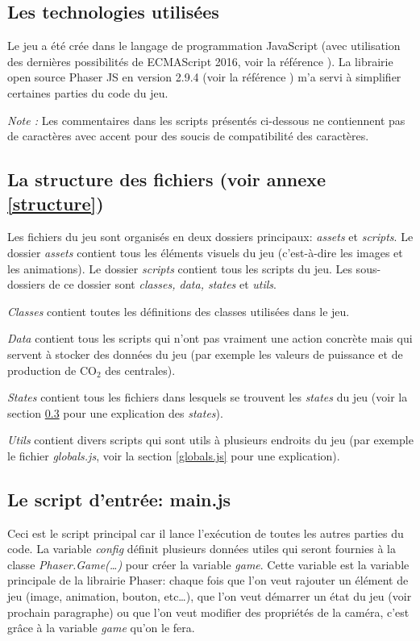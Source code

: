 \documentclass{article}
\begin{document}
        \subsection{Les technologies utilisées}
        Le jeu a été crée dans le langage de programmation JavaScript (avec utilisation des dernières possibilités de ECMAScript 2016, voir la référence \cite{ecma2016}). La librairie open source Phaser JS en version 2.9.4 (voir la référence \cite{phaser}) m'a servi à simplifier certaines parties du code du jeu.
        
        
        \textit{Note : } Les commentaires dans les scripts présentés ci-dessous ne contiennent pas de caractères avec accent pour des soucis de compatibilité des caractères.
        
        
        \subsection{La structure des fichiers (voir annexe \ref{structure})}
        Les fichiers du jeu sont organisés en deux dossiers principaux: \textit{assets} et \textit{scripts}. Le dossier \textit{assets} contient tous les éléments visuels du jeu (c'est-à-dire les images et les animations). Le dossier \textit{scripts} contient tous les scripts du jeu. Les sous-dossiers de ce dossier sont \textit{classes, data, states} et \textit{utils}.
        
        
         \textit{Classes} contient toutes les définitions des classes utilisées dans le jeu. 
         
         
         \textit{Data} contient tous les scripts qui n'ont pas vraiment une action concrète mais qui servent à stocker des données du jeu (par exemple les valeurs de puissance et de production de CO$_{2}$ des centrales).
         
         
         \textit{States} contient tous les fichiers dans lesquels se trouvent les \textit{states} du jeu (voir la section \ref{main.js} pour une explication des \textit{states}).
         
         
         \textit{Utils} contient divers scripts qui sont utils à plusieurs endroits du jeu (par exemple le fichier \textit{globals.js}, voir la section \ref{globals.js} pour une explication).
        
       	
		\subsection{Le script d'entrée: main.js} \label{main.js}
		
		Ceci est le script principal car il lance l'exécution de toutes les autres parties du code.
		La variable \textit{config} définit plusieurs données utiles qui seront fournies à la classe \textit{Phaser.Game(\dots)} pour créer la variable \textit{game}. Cette variable est la variable principale de la librairie Phaser: chaque fois que l'on veut rajouter un élément de jeu (image, animation, bouton, etc\dots), que l'on veut démarrer un état du jeu (voir prochain paragraphe) ou que l'on veut modifier des propriétés de la caméra, c'est grâce à la variable \textit{game} qu'on le fera.
		
\end{document}

